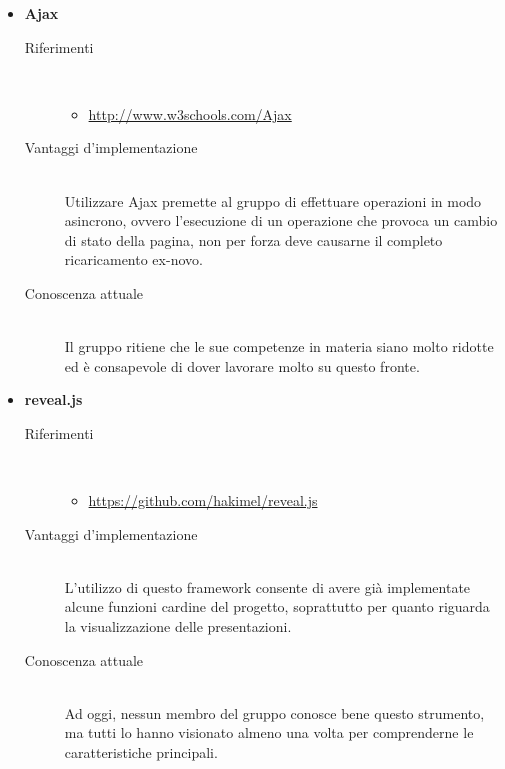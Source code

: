 \begin{itemize}
\begin{description}
	\end{description}
	\item \textbf{Ajax}
	\begin{description}
		\item[Riferimenti] \hfill \\
		\begin{itemize}
			\item \url{http://www.w3schools.com/Ajax}
		\end{itemize}
		\item[Vantaggi d'implementazione] \hfill \\ Utilizzare Ajax premette al gruppo di effettuare operazioni in modo asincrono, ovvero l’esecuzione di un operazione che provoca un cambio di stato della pagina, non per forza deve causarne il completo ricaricamento ex-novo.
		\item[Conoscenza attuale]\hfill \\  Il gruppo ritiene che le sue competenze in materia siano molto ridotte ed è consapevole di dover lavorare molto su questo fronte.
	\end{description}
	\item \textbf{reveal.js}
	\begin{description}
		\item[Riferimenti] \hfill \\
		\begin{itemize}
			\item \url{https://github.com/hakimel/reveal.js}
		\end{itemize}
		\item[Vantaggi d'implementazione] \hfill \\ L’utilizzo di questo framework consente di avere già implementate alcune funzioni cardine del progetto, soprattutto per quanto riguarda la visualizzazione delle presentazioni.
		\item[Conoscenza attuale] \hfill \\  Ad oggi, nessun membro del gruppo conosce bene questo strumento, ma tutti lo hanno visionato almeno una volta per comprenderne le caratteristiche principali.
	\end{description}
\end{itemize}
